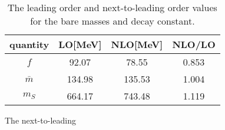 \begin{table}[!htb]
    \centering
    \caption{The leading order and next-to-leading order values for the bare masses and decay constant.}
    \label{table: nlo values}
    \begin{tabular}{c c c c}
        \hline \hline
        quantity & LO[MeV] & NLO[MeV] & NLO/LO \\
        \hline
        $f$ & 92.07 & 78.55 & 0.853\\
        $\bar m$ & 134.98 & 135.53 & 1.004 \\
        $m_S$ & 664.17 & 743.48 & 1.119
    \end{tabular}
\end{table}


The next-to-leading 


